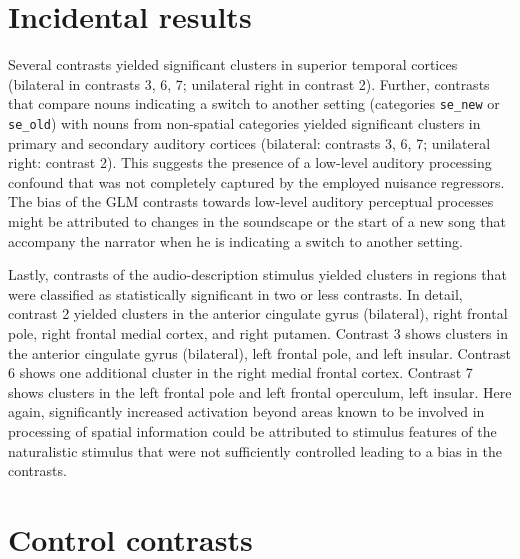 \documentclass[english,11pt]{article}
\begin{document}
\section{Incidental results}

Several contrasts yielded significant clusters in superior temporal cortices
(bilateral in contrasts 3, 6, 7; unilateral right in contrast 2).
Further, contrasts that compare nouns indicating a switch to another setting
(categories \texttt{se\_new} or \texttt{se\_old}) with nouns from non-spatial
categories yielded significant clusters in primary and secondary auditory
cortices (bilateral: contrasts 3, 6, 7; unilateral right: contrast 2).
This suggests the presence of a low-level auditory processing confound that was
not completely captured by the employed nuisance regressors.
The bias of the GLM contrasts towards low-level auditory perceptual processes
might be attributed to changes in the soundscape or the start of a new song that
accompany the narrator when he is indicating a switch to another setting.

%
Lastly, contrasts of the audio-description stimulus yielded clusters in regions
that were classified as statistically significant in two or less contrasts.
In detail, contrast 2 yielded clusters in the anterior cingulate gyrus
(bilateral), right frontal pole, right frontal medial cortex, and right putamen.
Contrast 3 shows clusters in the anterior cingulate gyrus (bilateral), left
frontal pole, and left insular.
Contrast 6 shows one additional cluster in the right medial frontal cortex.
Contrast 7 shows clusters in the left frontal pole and left frontal operculum,
left insular.
Here again, significantly increased activation beyond areas known to be involved
in processing of spatial information could be attributed to stimulus features of
the naturalistic stimulus that were not sufficiently controlled leading to a
bias in the contrasts.


\section{Control contrasts}

\end{document}
